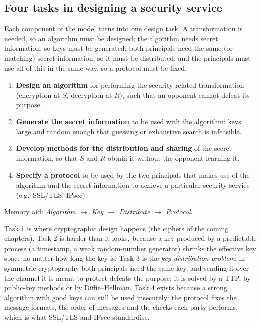 \subsection{Four tasks in designing a security service}
Each component of the model turns into one design task. A transformation is needed, so an algorithm must be designed; the algorithm needs secret information, so keys must be generated; both principals need the same (or matching) secret information, so it must be distributed; and the principals must use all of this in the same way, so a protocol must be fixed.

\begin{mustknow}
\begin{enumerate}[leftmargin=1.5em]
  \item \textbf{Design an algorithm} for performing the security-related transformation (encryption at $S$, decryption at $R$), such that an opponent cannot defeat its purpose.
  \item \textbf{Generate the secret information} to be used with the algorithm: keys large and random enough that guessing or exhaustive search is infeasible.
  \item \textbf{Develop methods for the distribution and sharing} of the secret information, so that $S$ and $R$ obtain it without the opponent learning it.
  \item \textbf{Specify a protocol} to be used by the two principals that makes use of the algorithm and the secret information to achieve a particular security service (e.g.\ SSL/TLS, IPsec).
\end{enumerate}
Memory aid: \emph{Algorithm $\to$ Key $\to$ Distribute $\to$ Protocol}.
\end{mustknow}

Task 1 is where cryptographic design happens (the ciphers of the coming chapters). Task 2 is harder than it looks, because a key produced by a predictable process (a timestamp, a weak random-number generator) shrinks the effective key space no matter how long the key is. Task 3 is the \emph{key distribution problem}: in symmetric cryptography both principals need the same key, and sending it over the channel it is meant to protect defeats the purpose; it is solved by a TTP, by public-key methods or by Diffie--Hellman. Task 4 exists because a strong algorithm with good keys can still be used insecurely: the protocol fixes the message formats, the order of messages and the checks each party performs, which is what SSL/TLS and IPsec standardise.

